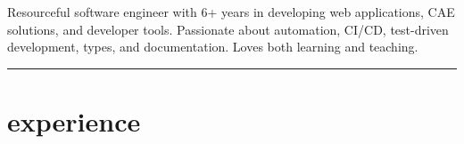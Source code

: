 \documentclass{mycv}
\begin{document}
\header{\phone}{\github}{\email}{\linkedin}

\begin{objective}
    Resourceful software engineer with 6+ years in developing web applications, CAE solutions, and developer tools.
    Passionate about automation, CI/CD, test-driven development, types, and documentation.
    Loves both learning and teaching.
\end{objective}

\vspace{-\parskip}\noindent\rule{\textwidth}{0.4pt}

\section{experience}
\end{document}
